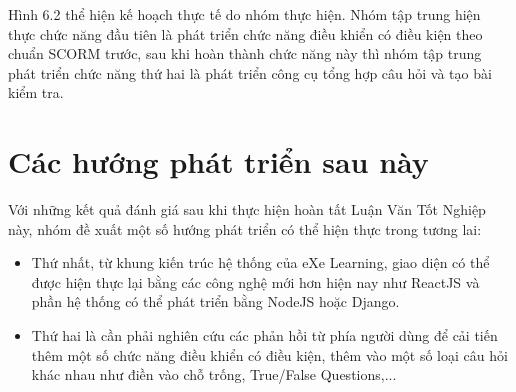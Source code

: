 	\newpage
	
	
	Hình 6.2 thể hiện kế hoạch thực tế do nhóm thực hiện. Nhóm tập trung hiện thực chức năng đầu tiên là phát triển chức năng điều khiển có điều kiện theo chuẩn SCORM trước, sau khi hoàn thành chức năng này thì nhóm tập trung phát triển chức năng thứ hai là phát triển công cụ tổng hợp câu hỏi và tạo bài kiểm tra.
	
\section{Các hướng phát triển sau này}

Với những kết quả đánh giá sau khi thực hiện hoàn tất Luận Văn Tốt Nghiệp này, nhóm đề xuất một số hướng phát triển có thể hiện thực trong tương lai:
	\begin{itemize}
		\item Thứ nhất, từ khung kiến trúc hệ thống của eXe Learning, giao diện có thể được hiện thực lại bằng các công nghệ mới hơn hiện nay như ReactJS và phần hệ thống có thể phát triển bằng NodeJS hoặc Django.
		
		\item Thứ hai là cần phải nghiên cứu các phản hồi từ phía người dùng để cải tiến thêm một số chức năng điều khiển có điều kiện, thêm vào một số loại câu hỏi khác nhau như điền vào chỗ trống, True/False Questions,...
	\end{itemize}

